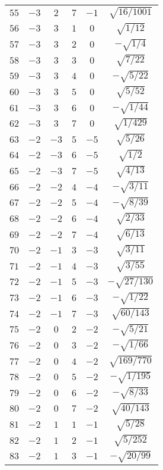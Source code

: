 \begin{table}
\begin{center}
\begin{tabular}{|c|c|c|c|c|c|}
$55$ & $-3$ & $2$ & $7$ & $-1$ & $\sqrt{16/1001}$ \\ 
$56$ & $-3$ & $3$ & $1$ & $0$ & $\sqrt{1/12}$ \\ 
$57$ & $-3$ & $3$ & $2$ & $0$ & $-\sqrt{1/4}$ \\ 
$58$ & $-3$ & $3$ & $3$ & $0$ & $\sqrt{7/22}$ \\ 
$59$ & $-3$ & $3$ & $4$ & $0$ & $-\sqrt{5/22}$ \\ 
$60$ & $-3$ & $3$ & $5$ & $0$ & $\sqrt{5/52}$ \\ 
$61$ & $-3$ & $3$ & $6$ & $0$ & $-\sqrt{1/44}$ \\ 
$62$ & $-3$ & $3$ & $7$ & $0$ & $\sqrt{1/429}$ \\ 
$63$ & $-2$ & $-3$ & $5$ & $-5$ & $\sqrt{5/26}$ \\ 
$64$ & $-2$ & $-3$ & $6$ & $-5$ & $\sqrt{1/2}$ \\ 
$65$ & $-2$ & $-3$ & $7$ & $-5$ & $\sqrt{4/13}$ \\ 
$66$ & $-2$ & $-2$ & $4$ & $-4$ & $-\sqrt{3/11}$ \\ 
$67$ & $-2$ & $-2$ & $5$ & $-4$ & $-\sqrt{8/39}$ \\ 
$68$ & $-2$ & $-2$ & $6$ & $-4$ & $\sqrt{2/33}$ \\ 
$69$ & $-2$ & $-2$ & $7$ & $-4$ & $\sqrt{6/13}$ \\ 
$70$ & $-2$ & $-1$ & $3$ & $-3$ & $\sqrt{3/11}$ \\ 
$71$ & $-2$ & $-1$ & $4$ & $-3$ & $\sqrt{3/55}$ \\ 
$72$ & $-2$ & $-1$ & $5$ & $-3$ & $-\sqrt{27/130}$ \\ 
$73$ & $-2$ & $-1$ & $6$ & $-3$ & $-\sqrt{1/22}$ \\ 
$74$ & $-2$ & $-1$ & $7$ & $-3$ & $\sqrt{60/143}$ \\ 
$75$ & $-2$ & $0$ & $2$ & $-2$ & $-\sqrt{5/21}$ \\ 
$76$ & $-2$ & $0$ & $3$ & $-2$ & $-\sqrt{1/66}$ \\ 
$77$ & $-2$ & $0$ & $4$ & $-2$ & $\sqrt{169/770}$ \\ 
$78$ & $-2$ & $0$ & $5$ & $-2$ & $-\sqrt{1/195}$ \\ 
$79$ & $-2$ & $0$ & $6$ & $-2$ & $-\sqrt{8/33}$ \\ 
$80$ & $-2$ & $0$ & $7$ & $-2$ & $\sqrt{40/143}$ \\ 
$81$ & $-2$ & $1$ & $1$ & $-1$ & $\sqrt{5/28}$ \\ 
$82$ & $-2$ & $1$ & $2$ & $-1$ & $\sqrt{5/252}$ \\ 
$83$ & $-2$ & $1$ & $3$ & $-1$ & $-\sqrt{20/99}$ \\ 

\end{tabular}
\end{center}
\end{table}
